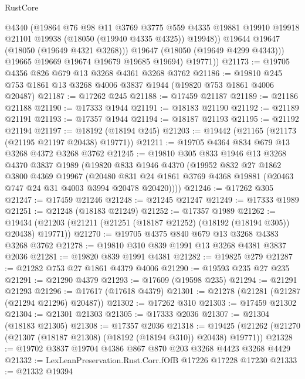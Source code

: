 \begin{lexlean}{RustCore}
\begin{coremodule}
                @4340
                (@19864
                  @76
                  @98
                  @11
                  @3769
                  @3775
                  @559
                  @4335
                  @19881
                  @19910
                  @19918
                  @21101
                  @19938
                  (@18050 (@19940 @4335 @4325))
                  @19948))
              @19644
              @19647
              (@18050 (@19649 @4321 @3268)))
            @19647
            (@18050 (@19649 @4299 @4343)))
          @19665
          @19669
          @19674
          @19679
          @19685
          @19694)
        @19771))
@21173 := @19705 @4356 @826 @679 @13 @3268 @4361 @3268 @3762
@21186 := @19810 @245 @753 @1861 @13 @3268 @4006 @3837 @1944 (@19820 @753 @1861 @4006 @20487)
@21187 := @17262 @245
@21188 := @17459 @21187
@21189 := @21186 @21188
@21190 := @17333 @1944
@21191 := @18183 @21190
@21192 := @21189 @21191
@21193 := @17357 @1944
@21194 := @18187 @21193
@21195 := @21192 @21194
@21197 := @18192 (@18194 @245)
@21203 := @19442 (@21165 (@21173 (@21195 @21197 @20438) @19771))
@21211 := @19705 @4364 @834 @679 @13 @3268 @4372 @3268 @3762
@21245 := @19810
    @305
    @833
    @1946
    @13
    @3268
    @4370
    @3837
    @1989
    (@19820
      @833
      @1946
      @4370
      (@19952
        @832
        @27
        @1862
        @3800
        @4369
        @19967
        (@20480 @831 @24 @1861 @3769 @4368 @19881 (@20463 @747 @24 @31 @4003 @3994 @20478 @20420))))
@21246 := @17262 @305
@21247 := @17459 @21246
@21248 := @21245 @21247
@21249 := @17333 @1989
@21251 := @21248 (@18183 @21249)
@21252 := @17357 @1989
@21262 := @19434 (@21203 (@21211 (@21251 (@18187 @21252) (@18192 (@18194 @305)) @20438) @19771))
@21270 := @19705 @4375 @840 @679 @13 @3268 @4383 @3268 @3762
@21278 := @19810 @310 @839 @1991 @13 @3268 @4381 @3837 @2036
@21281 := @19820 @839 @1991 @4381
@21282 := @19825 @279
@21287 := @21282 @753 @27 @1861 @4379 @4006
@21290 := @19593 @235 @27 @235
@21291 := @21290 @4379
@21293 := @17609 (@19598 @235)
@21294 := @21291 @21293
@21296 := @17617 (@17618 @4379)
@21301 := @21278 (@21281 (@21287 (@21294 @21296) @20487))
@21302 := @17262 @310
@21303 := @17459 @21302
@21304 := @21301 @21303
@21305 := @17333 @2036
@21307 := @21304 (@18183 @21305)
@21308 := @17357 @2036
@21318 := @19425 (@21262 (@21270 (@21307 (@18187 @21308) (@18192 (@18194 @310)) @20438) @19771))
@21328 := @19702 @3837 @19704 @4386 @867 @870 @203 @3268 @4423 @3268 @4429
@21332 := LexLeanPreservation.Rust.Corr.fOfB @17226 @17228 @17230
@21333 := @21332 @19394

\end{coremodule}
\end{lexlean}
